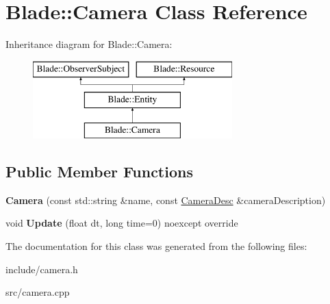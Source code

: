 \hypertarget{class_blade_1_1_camera}{}\section{Blade\+:\+:Camera Class Reference}
\label{class_blade_1_1_camera}
Inheritance diagram for Blade\+:\+:Camera\+:\begin{figure}[H]
\begin{center}
\leavevmode
\includegraphics[height=3.000000cm]{class_blade_1_1_camera}
\end{center}
\end{figure}
\subsection*{Public Member Functions}
\begin{DoxyCompactItemize}
\item 
\mbox{\label{class_blade_1_1_camera_a84af8fc36ff71a31cfd34861d52e4ac5}} 
{\bfseries Camera} (const std\+::string \&name, const \hyperlink{struct_blade_1_1_camera_desc}{Camera\+Desc} \&camera\+Description)
\item 
\mbox{\label{class_blade_1_1_camera_aa5bf0579c37fb34e5cdec46f1dbcf87b}} 
void {\bfseries Update} (float dt, long time=0) noexcept override
\end{DoxyCompactItemize}


The documentation for this class was generated from the following files\+:\begin{DoxyCompactItemize}
\item 
include/camera.\+h\item 
src/camera.\+cpp\end{DoxyCompactItemize}

